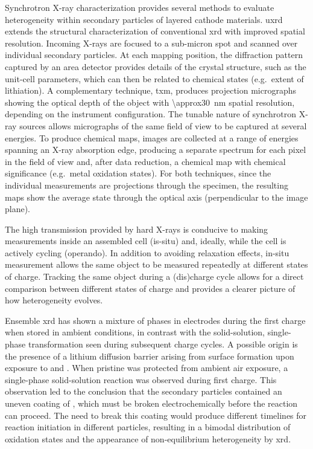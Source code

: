 \documentclass{article}
\begin{document}
Synchrotron X-ray characterization provides several methods to
evaluate heterogeneity within secondary particles of layered cathode
materials. \Gls{uxrd} extends the structural characterization of
conventional \gls{xrd} with improved spatial resolution. Incoming
X-rays are focused to a sub-micron spot and scanned over individual
secondary particles. At each mapping position, the diffraction pattern
captured by an area detector provides details of the crystal
structure, such as the unit-cell parameters, which can then be related
to chemical states (e.g.\ extent of lithiation). A complementary
technique, \Gls{txm}, produces projection micrographs showing the
optical depth of the object with \SI{\approx30}{nm} spatial
resolution, depending on the instrument configuration. The tunable
nature of synchrotron X-ray sources allows micrographs of the same
field of view to be captured at several energies. To produce chemical
maps, images are collected at a range of energies spanning an X-ray
absorption edge, producing a separate spectrum for each pixel in the
field of view and, after data reduction, a chemical map with chemical
significance (e.g.\ metal oxidation states). For both techniques,
since the individual measurements are projections through the
specimen, the resulting maps show the average state through the
optical axis (perpendicular to the image plane).

The high transmission provided by hard X-rays is conducive to making
measurements inside an assembled cell (is-situ) and, ideally, while
the cell is actively cycling (operando). In addition to avoiding
relaxation effects, in-situ measurement allows the same object to be
measured repeatedly at different states of charge. Tracking the same
object during a (dis)charge cycle allows for a direct comparison
between different states of charge and provides a clearer picture of
how heterogeneity evolves.


Ensemble \gls{xrd} has shown a mixture of phases in \nca{} electrodes
during the first charge when stored in ambient conditions, in contrast
with the solid-solution, single-phase transformation seen during
subsequent charge cycles\cite{robert2015}. A possible origin is the
presence of a lithium diffusion barrier arising from surface
 formation upon exposure to  and . When
pristine \nca{} was protected from ambient air exposure, a
single-phase solid-solution reaction was observed during first
charge\cite{grenier2017}. This observation led to the conclusion that
the secondary particles contained an uneven coating of ,
which must be broken electrochemically before the reaction can
proceed. The need to break this coating would produce different
timelines for reaction initiation in different particles, resulting in
a bimodal distribution of oxidation states and the appearance of
non-equilibrium heterogeneity by \gls{xrd}.
\end{document}
